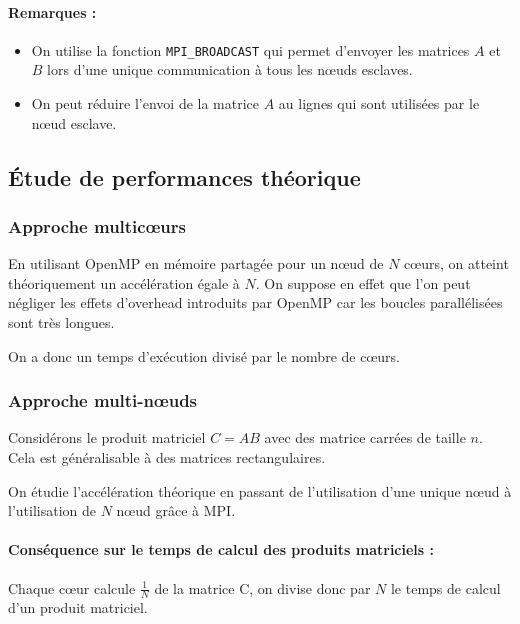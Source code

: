 \documentclass[11pt,a4paper]{article}
\begin{document}
		\paragraph{Remarques :}
		\begin{itemize}
			\item On utilise la fonction \texttt{MPI\_BROADCAST} qui permet d'envoyer les matrices $A$ et $B$ lors d'une unique communication à tous les n\oe{}uds esclaves.
			\item On peut réduire l'envoi de la matrice $A$ au lignes qui sont utilisées par le n\oe{}ud esclave.
		\end{itemize}

	\subsection{Étude de performances théorique}

		\subsubsection{Approche multic\oe{}urs}

		En utilisant OpenMP en mémoire partagée pour un n\oe{}ud de $N$ c\oe{}urs, on atteint théoriquement un accélération égale à $N$. On suppose en effet que l'on peut négliger les effets d'overhead introduits par OpenMP car les boucles parallélisées sont très longues.

		On a donc un temps d'exécution divisé par le nombre de c\oe{}urs.

		\subsubsection{Approche multi-n\oe{}uds}

			Considérons le produit matriciel $C = AB$ avec des matrice carrées de taille $n$. Cela est généralisable à des matrices rectangulaires.

			On étudie l'accélération théorique en passant de l'utilisation d'une unique n\oe{}ud à l'utilisation de $N$ n\oe{}ud grâce à MPI.
			\paragraph{Conséquence sur le temps de calcul des produits matriciels :}
				Chaque c\oe{}ur calcule $\frac{1}{N}$ de la matrice C, on divise donc par $N$ le temps de calcul d'un produit matriciel.
\end{document}
